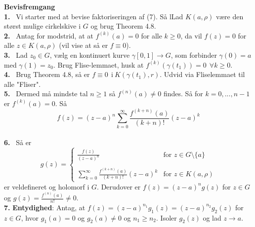 \documentclass[10pt,a4paper]{article}
\theoremstyle{definition}
\begin{document}
\begin{framed}
\textbf{Bevisfremgang} \\
\textbf{1.} \ Vi starter med at bevise faktoriseringen af (7). Så lLad $K(a,\rho)$ være den størst mulige cirkelskive i $G$ og brug Theorem 4.8. \\
\textbf{2.} \ Antag for modstrid, at at $f^{(k)}(a)=0$ for alle $k \geq 0$, da vil $f(z)=0$ for alle $z \in K(a,\rho)$ (vil vise at så er $f \equiv 0$). \\
\textbf{3.} \ Lad $z_0 \in G$, vælg en kontinuert kurve $\gamma[0,1] \rightarrow G$, som forbinder $\gamma (0)=a $ med $\gamma(1)=z_0$. Brug Flise-lemmaet, husk at $f^{(k)}(\gamma(t_1)) = 0 \ \ \forall k \geq 0$.\\
\textbf{4.} \ Brug Theorem 4.8, så er $f \equiv 0 \ \ \text{i} \ K(\gamma(t_1),r).$ Udvid via Fliselemmaet til alle "Fliser".\\
\textbf{5.} \ Dermed må mindste tal $n \geq 1$ så $f^{(n)}(a) \neq 0$ findes. Så for $k=0,...,n-1$ er $f^{(k)}(a)=0$. Så
$$f(z) = (z-a)^n \sum\limits_{k=0}^\infty \frac{f^{(k+n)}(a)}{(k+n)!} (z-a)^k$$\\
\textbf{6.} \ Så er 
$$g(z) =
\left\{
	\begin{array}{ll}
		\frac{f(z)}{(z-a)^n} & \text{for } z \in G \setminus \{a\}\\ \\
		\sum\limits_{k=0}^\infty \frac{f^{(k+n)}(a)}{(k+n)!}(z-a)^k & \text{for } z \in K(a,\rho)
	\end{array}
\right.$$
er veldefineret og holomorf i $G$. Derudover er $f(z) = (z-a)^n g(z)$ for $z \in G$ og $g(z) = \frac{f^{(n)}(a)}{n!} \neq 0$.\\
\textbf{7.} \textbf{Entydighed}: Antag, at $f(z) = (z-a)^{n_1} g_1(z) = (z-a)^{n_2} g_2(z)$ for $z \in G$, hvor $g_1(a) = 0$ og $g_2(a) \neq 0$ og $n_1 \geq n_2$. Isoler $g_2(z)$ og lad $z \rightarrow a$.
\end{framed}
\end{document}
